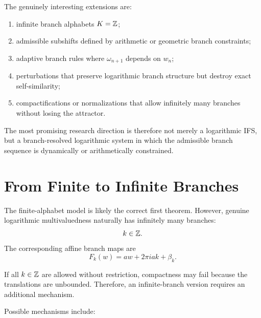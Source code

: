 	The genuinely interesting extensions are:
	
	\begin{enumerate}
		\item infinite branch alphabets \(K=\mathbb{Z}\);
		\item admissible subshifts defined by arithmetic or geometric branch constraints;
		\item adaptive branch rules where \(\omega_{n+1}\) depends on \(w_n\);
		\item perturbations that preserve logarithmic branch structure but destroy exact self-similarity;
		\item compactifications or normalizations that allow infinitely many branches without losing the attractor.
	\end{enumerate}
	
	The most promising research direction is therefore not merely a logarithmic IFS, but a branch-resolved logarithmic system in which the admissible branch sequence is dynamically or arithmetically constrained.
	
	\section{From Finite to Infinite Branches}
	
	The finite-alphabet model is likely the correct first theorem. However, genuine logarithmic multivaluedness naturally has infinitely many branches:
	\[
	k\in\mathbb{Z}.
	\]
	The corresponding affine branch maps are
	\[
	F_k(w)=a w + 2\pi i a k + \beta_k.
	\]
	
	If all \(k\in\mathbb{Z}\) are allowed without restriction, compactness may fail because the translations are unbounded. Therefore, an infinite-branch version requires an additional mechanism.
	
	Possible mechanisms include:
	
